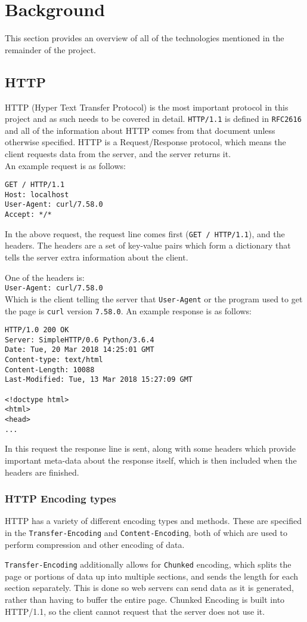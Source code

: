 \section{Background}
This section provides an overview of all of the technologies mentioned in the remainder of the project.
\subsection{HTTP}
HTTP (Hyper Text Transfer Protocol) is the most important protocol in this project and as such needs to be covered in detail.
\texttt{HTTP/1.1} is defined in \texttt{RFC2616}\cite{rfc2616} and all of the information about HTTP comes from that document unless otherwise specified.
HTTP is a Request/Response protocol, which means the client requests data from the server, and the server returns it.\\
An example request is as follows:
\begin{verbatim}
GET / HTTP/1.1
Host: localhost
User-Agent: curl/7.58.0
Accept: */*
\end{verbatim}
In the above request, the request line comes first (\texttt{GET / HTTP/1.1}), and the headers. The headers are a set of key-value pairs which form a dictionary that tells the server extra information about the client.

One of the headers is:\\
\texttt{User-Agent: curl/7.58.0}\\
Which is the client telling the server that \texttt{User-Agent} or the program used to get the page is \texttt{curl} version \texttt{7.58.0}.\vspace{0.4cm}\newline
An example response is as follows:
\begin{verbatim}
HTTP/1.0 200 OK
Server: SimpleHTTP/0.6 Python/3.6.4
Date: Tue, 20 Mar 2018 14:25:01 GMT
Content-type: text/html
Content-Length: 10088
Last-Modified: Tue, 13 Mar 2018 15:27:09 GMT

<!doctype html>
<html>
<head>
...
\end{verbatim}
In this request the response line is sent, along with some headers which provide important meta-data about the response itself, which is then included when the headers are finished.

\subsubsection{HTTP Encoding types}
HTTP has a variety of different encoding types and methods.
These are specified in the \texttt{Transfer-Encoding} and \texttt{Content-Encoding}, both of which are  used to perform compression and other encoding of data.\par
\texttt{Transfer-Encoding} additionally allows for \texttt{Chunked} encoding\cite{rfc7230}, which splits the page or portions of data up into multiple sections, and sends the length for each section separately. This is done so web servers can send data as it is generated, rather than having to buffer the entire page. Chunked Encoding is built into HTTP/1.1, so the client cannot request that the server does not use it.

